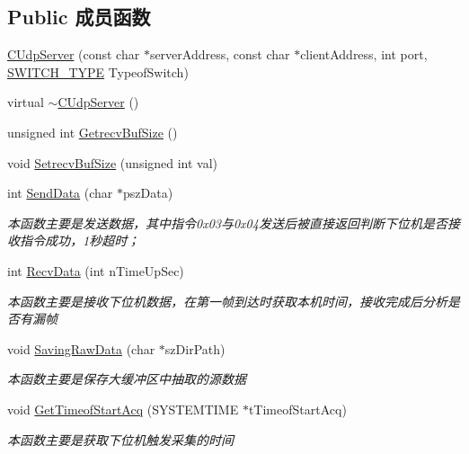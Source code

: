 \subsection*{Public 成员函数}
\begin{DoxyCompactItemize}
\item 
\hyperlink{class_c_udp_server_a19041db501fb138a97d3b492f8f2ab10}{C\+Udp\+Server} (const char $\ast$server\+Address, const char $\ast$client\+Address, int port, \hyperlink{_c_udp_server_8h_a41273fdeb63230b3a5c360d8c7c11b82}{S\+W\+I\+T\+C\+H\+\_\+\+T\+Y\+PE} Typeof\+Switch)
\item 
virtual \hyperlink{class_c_udp_server_a541cb9eac44794602e78217e636910b6}{$\sim$\+C\+Udp\+Server} ()
\item 
unsigned int \hyperlink{class_c_udp_server_aea22b4acc50416dd8048f42b54ec6d5d}{Getrecv\+Buf\+Size} ()
\item 
void \hyperlink{class_c_udp_server_ad3678f42d43bec018b78eab515d572d2}{Setrecv\+Buf\+Size} (unsigned int val)
\item 
int \hyperlink{class_c_udp_server_a7372271e50c6806763777245c6a0a2b8}{Send\+Data} (char $\ast$psz\+Data)
\begin{DoxyCompactList}\small\item\em 本函数主要是发送数据，其中指令0x03与0x04发送后被直接返回判断下位机是否接收指令成功，1秒超时； \end{DoxyCompactList}\item 
int \hyperlink{class_c_udp_server_a21fbbdcc6e88473bae9488405dcc9b95}{Recv\+Data} (int n\+Time\+Up\+Sec)
\begin{DoxyCompactList}\small\item\em 本函数主要是接收下位机数据，在第一帧到达时获取本机时间，接收完成后分析是否有漏帧 \end{DoxyCompactList}\item 
void \hyperlink{class_c_udp_server_a47ad892f309e7274cc2938c7cee7ba1f}{Saving\+Raw\+Data} (char $\ast$sz\+Dir\+Path)
\begin{DoxyCompactList}\small\item\em 本函数主要是保存大缓冲区中抽取的源数据 \end{DoxyCompactList}\item 
void \hyperlink{class_c_udp_server_ae64df8898d87418be839fed707cebe57}{Get\+Timeof\+Start\+Acq} (S\+Y\+S\+T\+E\+M\+T\+I\+ME $\ast$t\+Timeof\+Start\+Acq)
\begin{DoxyCompactList}\small\item\em 本函数主要是获取下位机触发采集的时间 \end{DoxyCompactList}\end{DoxyCompactItemize}
